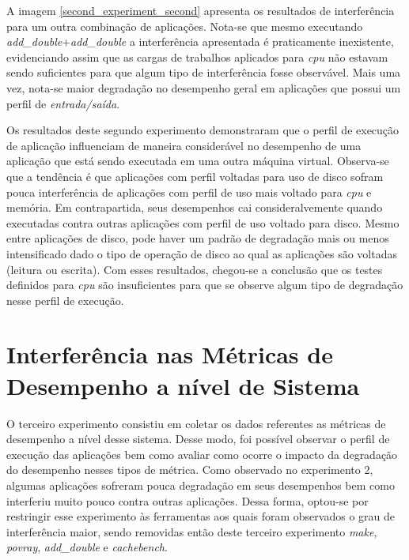A imagem \ref{second_experiment_second} apresenta os resultados de interferência para um outra combinação de aplicações. Nota-se que mesmo executando \textit{add\_double}+\textit{add\_double} a interferência apresentada é praticamente inexistente, evidenciando assim que as cargas de trabalhos aplicados para \textit{cpu} não estavam sendo suficientes para que algum tipo de interferência fosse observável. Mais uma vez, nota-se maior degradação no desempenho geral em aplicações que possui um perfil de \textit{entrada/saída}.

Os resultados deste segundo experimento demonstraram que o perfil de execução de aplicação influenciam de maneira considerável no desempenho de uma aplicação que está sendo executada em uma outra máquina virtual. Observa-se que a tendência é que aplicações com perfil voltadas para uso de disco sofram pouca interferência de aplicações com perfil de uso mais voltado para \textit{cpu} e memória. Em contrapartida, seus desempenhos cai consideralvemente quando executadas contra outras aplicações com perfil de uso voltado para disco. Mesmo entre aplicações de disco, pode haver um padrão de degradação mais ou menos intensificado dado o tipo de operação de disco ao qual as aplicações são voltadas (leitura ou escrita). Com esses resultados, chegou-se a conclusão que os testes definidos para \textit{cpu} são insuficientes para que se observe algum tipo de degradação nesse perfil de execução. 

\section{Interferência nas Métricas de Desempenho a nível de Sistema}
O terceiro experimento consistiu em coletar os dados referentes as métricas de desempenho a nível desse sistema. Desse modo, foi possível observar o perfil de execução das aplicações bem como avaliar como ocorre o impacto da degradação do desempenho nesses tipos de métrica. Como observado no experimento 2, algumas aplicações sofreram pouca degradação em seus desempenhos bem como interferiu muito pouco contra outras aplicações. Dessa forma, optou-se por restringir esse experimento às ferramentas aos quais foram observados o grau de interferência maior, sendo removidas então deste terceiro experimento \textit{make}, \textit{povray}, \textit{add\_double} e \textit{cachebench}.

